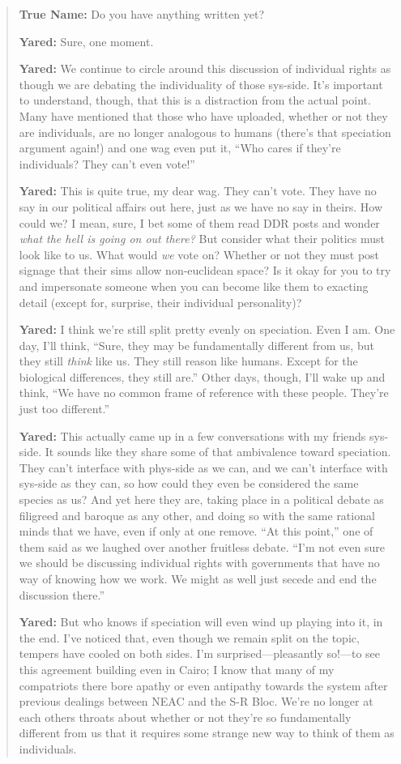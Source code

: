 \begin{quote}
\textbf{True Name:} Do you have anything written yet?

\textbf{Yared:} Sure, one moment.

\textbf{Yared:} We continue to circle around this discussion of individual rights as though we are debating the individuality of those sys-side. It's important to understand, though, that this is a distraction from the actual point. Many have mentioned that those who have uploaded, whether or not they are individuals, are no longer analogous to humans (there's that speciation argument again!) and one wag even put it, ``Who cares if they're individuals? They can't even vote!''

\textbf{Yared:} This is quite true, my dear wag. They can't vote. They have no say in our political affairs out here, just as we have no say in theirs. How could we? I mean, sure, I bet some of them read DDR posts and wonder \emph{what the hell is going on out there?} But consider what their politics must look like to us. What would \emph{we} vote on? Whether or not they must post signage that their sims allow non-euclidean space? Is it okay for you to try and impersonate someone when you can become like them to exacting detail (except for, surprise, their individual personality)?

\textbf{Yared:} I think we're still split pretty evenly on speciation. Even I am. One day, I'll think, ``Sure, they may be fundamentally different from us, but they still \emph{think} like us. They still reason like humans. Except for the biological differences, they still are.'' Other days, though, I'll wake up and think, ``We have no common frame of reference with these people. They're just too different.''

\textbf{Yared:} This actually came up in a few conversations with my friends sys-side. It sounds like they share some of that ambivalence toward speciation. They can't interface with phys-side as we can, and we can't interface with sys-side as they can, so how could they even be considered the same species as us? And yet here they are, taking place in a political debate as filigreed and baroque as any other, and doing so with the same rational minds that we have, even if only at one remove. ``At this point,'' one of them said as we laughed over another fruitless debate. ``I'm not even sure we should be discussing individual rights with governments that have no way of knowing how we work. We might as well just secede and end the discussion there.''

\textbf{Yared:} But who knows if speciation will even wind up playing into it, in the end. I've noticed that, even though we remain split on the topic, tempers have cooled on both sides. I'm surprised---pleasantly so!---to see this agreement building even in Cairo; I know that many of my compatriots there bore apathy or even antipathy towards the system after previous dealings between NEAC and the S-R Bloc. We're no longer at each others throats about whether or not they're so fundamentally different from us that it requires some strange new way to think of them as individuals.


\end{quote}
